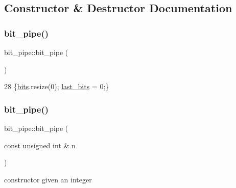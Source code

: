 \subsection{Constructor \& Destructor Documentation}
\mbox{\label{classbit__pipe_a6dab67e6a47c1d1f020fe769df27cef1}} 
\subsubsection{\texorpdfstring{bit\+\_\+pipe()}{bit\_pipe()}\hspace{0.1cm}{\footnotesize\ttfamily [1/3]}}
{\footnotesize\ttfamily bit\+\_\+pipe\+::bit\+\_\+pipe (\begin{DoxyParamCaption}{ }\end{DoxyParamCaption})\hspace{0.3cm}{\ttfamily [inline]}}


\begin{DoxyCode}
28 \{\hyperlink{classbit__pipe_a86f38af1e9736b053728033490476b50}{bits}.resize(0); \hyperlink{classbit__pipe_a0f3e84b02751803adaab499b5dad86fe}{last\_bits} = 0;\}
\end{DoxyCode}
\mbox{\label{classbit__pipe_a381c4371859988c65802767d31fc7458}} 
\subsubsection{\texorpdfstring{bit\+\_\+pipe()}{bit\_pipe()}\hspace{0.1cm}{\footnotesize\ttfamily [2/3]}}
{\footnotesize\ttfamily bit\+\_\+pipe\+::bit\+\_\+pipe (\begin{DoxyParamCaption}\item[{const unsigned int \&}]{n }\end{DoxyParamCaption})}



constructor given an integer 

